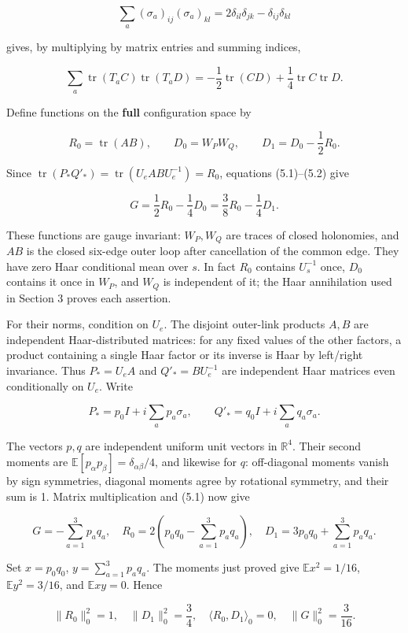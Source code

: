 \[
\sum_a(\sigma_a)_{ij}(\sigma_a)_{kl}
=2\delta_{il}\delta_{jk}-\delta_{ij}\delta_{kl}
\]

gives, by multiplying by matrix entries and summing indices,

\[
\sum_a\operatorname{tr}(T_aC)\operatorname{tr}(T_aD)
=-\frac12\operatorname{tr}(CD)+\frac14\operatorname{tr}C\operatorname{tr}D.
\tag{5.2}
\]

Define functions on the \textbf{full} configuration space by

\[
R_0=\operatorname{tr}(AB),\qquad D_0=W_PW_Q,
\qquad D_1=D_0-\frac12R_0.
\tag{5.3}
\]

Since
\(\operatorname{tr}(P_*Q'_*)=\operatorname{tr}(U_eABU_e^{-1})=R_0\),
equations (5.1)--(5.2) give

\[
G=\frac12R_0-\frac14D_0
=\frac38R_0-\frac14D_1.
\tag{5.4}
\]

These functions are gauge invariant: \(W_P,W_Q\) are traces of closed
holonomies, and \(AB\) is the closed six-edge outer loop after
cancellation of the common edge. They have zero Haar conditional mean
over \(s\). In fact \(R_0\) contains \(U_s^{-1}\) once, \(D_0\) contains
it once in \(W_P\), and \(W_Q\) is independent of it; the Haar
annihilation used in Section 3 proves each assertion.

For their norms, condition on \(U_e\). The disjoint outer-link products
\(A,B\) are independent Haar-distributed matrices: for any fixed values
of the other factors, a product containing a single Haar factor or its
inverse is Haar by left/right invariance. Thus \(P_*=U_eA\) and
\(Q'_*=BU_e^{-1}\) are independent Haar matrices even conditionally on
\(U_e\). Write

\[
P_*=p_0I+i\sum_ap_a\sigma_a,\qquad
Q'_*=q_0I+i\sum_aq_a\sigma_a.
\]

The vectors \(p,q\) are independent uniform unit vectors in
\(\mathbb R^4\). Their second moments are
\(\mathbb E[p_\alpha p_\beta]=\delta_{\alpha\beta}/4\), and likewise for
\(q\): off-diagonal moments vanish by sign symmetries, diagonal moments
agree by rotational symmetry, and their sum is 1. Matrix multiplication
and (5.1) now give

\[
G=-\sum_{a=1}^3p_aq_a,\quad
R_0=2\left(p_0q_0-\sum_{a=1}^3p_aq_a\right),\quad
D_1=3p_0q_0+\sum_{a=1}^3p_aq_a.
\tag{5.5}
\]

Set \(x=p_0q_0\), \(y=\sum_{a=1}^3p_aq_a\). The moments just proved give
\(\mathbb E x^2=1/16\), \(\mathbb E y^2=3/16\), and \(\mathbb E xy=0\).
Hence

\[
\|R_0\|_0^2=1,\quad \|D_1\|_0^2=\frac34,
\quad\langle R_0,D_1\rangle_0=0,
\quad\|G\|_0^2=\frac3{16}.
\tag{5.6}
\]


